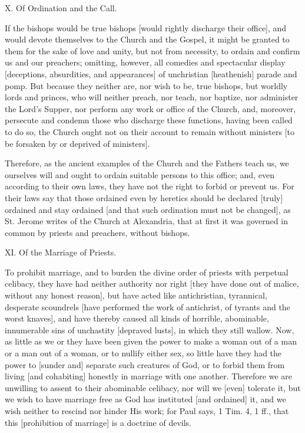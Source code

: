 X. Of Ordination and the Call.

If the bishops would be true bishops [would rightly discharge
their office], and would devote themselves to the Church and
the Gospel, it might be granted to them for the sake of love
and unity, but not from necessity, to ordain and confirm us
and our preachers; omitting, however, all comedies and
spectacular display [deceptions, absurdities, and appearances]
of unchristian [heathenish] parade and pomp. But because they
neither are, nor wish to be, true bishops, but worldly lords
and princes, who will neither preach, nor teach, nor baptize,
nor administer the Lord's Supper, nor perform any work or
office of the Church, and, moreover, persecute and condemn
those who discharge these functions, having been called to do
so, the Church ought not on their account to remain without
ministers [to be forsaken by or deprived of ministers].

Therefore, as the ancient examples of the Church and the
Fathers teach us, we ourselves will and ought to ordain
suitable persons to this office; and, even according to their
own laws, they have not the right to forbid or prevent us. For
their laws say that those ordained even by heretics should be
declared [truly] ordained and stay ordained [and that such
ordination must not be changed], as St. Jerome writes of the
Church at Alexandria, that at first it was governed in common
by priests and preachers, without bishops.

XI. Of the Marriage of Priests.

To prohibit marriage, and to burden the divine order of
priests with perpetual celibacy, they have had neither
authority nor right [they have done out of malice, without any
honest reason], but have acted like antichristian, tyrannical,
desperate scoundrels [have performed the work of antichrist,
of tyrants and the worst knaves], and have thereby caused all
kinds of horrible, abominable, innumerable sins of unchastity
[depraved lusts], in which they still wallow. Now, as little
as we or they have been given the power to make a woman out of
a man or a man out of a woman, or to nullify either sex, so
little have they had the power to [sunder and] separate such
creatures of God, or to forbid them from living [and
cohabiting] honestly in marriage with one another. Therefore
we are unwilling to assent to their abominable celibacy, nor
will we [even] tolerate it, but we wish to have marriage free
as God has instituted [and ordained] it, and we wish neither
to rescind nor hinder His work; for Paul says, 1 Tim. 4, 1
ff., that this [prohibition of marriage] is a doctrine of
devils.

